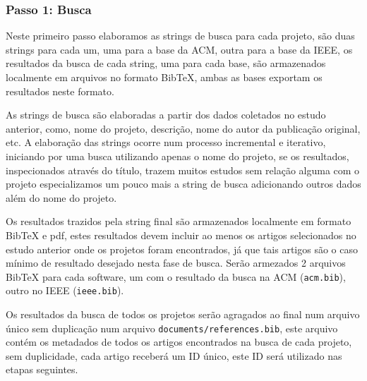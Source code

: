 \subsubsection{Passo 1: Busca}


Neste primeiro passo elaboramos as strings de busca para cada projeto, são duas
strings para cada um, uma para a base da ACM, outra para a base da IEEE, os
resultados da busca de cada string, uma para cada base, são armazenados
localmente em arquivos no formato BibTeX, ambas as bases exportam os resultados
neste formato.

As strings de busca são elaboradas a partir dos dados coletados no estudo
anterior, como, nome do projeto, descrição, nome do autor da publicação
original, etc. A elaboração das strings ocorre num processo incremental e
iterativo, iniciando por uma busca utilizando apenas o nome do projeto, se os
resultados, inspecionados através do título, trazem muitos estudos sem relação
alguma com o projeto especializamos um pouco mais a string de busca adicionando
outros dados além do nome do projeto.


Os resultados trazidos pela string final são armazenados localmente em formato
BibTeX e pdf, estes resultados devem incluir ao menos os artigos selecionados
no estudo anterior onde os projetos foram encontrados, já que tais artigos são
o caso mínimo de resultado desejado nesta fase de busca. Serão armezados 2
arquivos BibTeX para cada software, um com o resultado da busca na ACM
(\texttt{acm.bib}), outro no IEEE (\texttt{ieee.bib}).

Os resultados da busca de todos os projetos serão agragados ao final num
arquivo único sem duplicação num arquivo \texttt{documents/references.bib},
este arquivo contém os metadados de todos os artigos encontrados na busca
de cada projeto, sem duplicidade, cada artigo receberá um ID único, este ID
será utilizado nas etapas seguintes.


